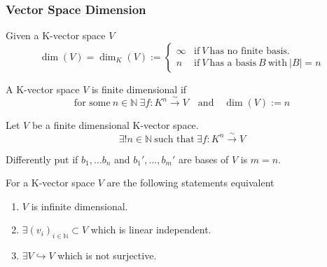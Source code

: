 \subsubsection{Vector Space Dimension}
\begin{definition}
   Given a K-vector space \(V\)
   \[\dim(V) = \dim_{K}(V) := \begin{cases}\infty & \text{if}~V~\text{has no finite basis.}\\n & \text{if}~V~\text{has a basis}~B~\text{with}~|B| = n\end{cases}\]
\end{definition}

\begin{definition}
   A K-vector space \(V\) is finite dimensional if
   \[\text{for some}~n \in \mathbb{N}~\exists f: K^n \xrightarrow{\sim} V \quad\text{and}\quad \dim(V) := n\]
\end{definition}

\begin{proposition}\label{pro:Kn_VS_isomorphism}
   Let \(V\) be a finite dimensional K-vector space.
   \[\exists! n \in \mathbb{N}~\text{such that}~\exists f: K^n \xrightarrow{\sim} V\]
\end{proposition}
\begin{remark}
   Differently put if \(b_1, \ldots b_n\) and \(b_1', \ldots, b_m'\) are bases of \(V\) is \(m = n\).
\end{remark}

\begin{proposition}
   For a K-vector space \(V\) are the following statements equivalent
   \begin{enumerate}[label=\roman*, align=Center]
      \item \(V\) is infinite dimensional.
      \item \(\exists (v_i)_{i \in \mathbb{N}} \subset V\) which is linear independent.
      \item \(\exists V \hookrightarrow V\) which is not surjective.
   \end{enumerate}
\end{proposition}

